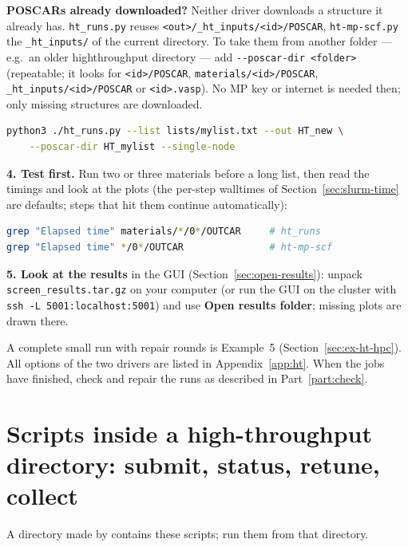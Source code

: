 \documentclass[11pt,a4paper]{scrartcl}
\newcommand{\cmd}[1]{\texttt{\detokenize{#1}}}
\begin{document}
\textbf{POSCARs already downloaded?}  Neither driver downloads a structure
it already has.  \texttt{ht\_runs.py} reuses
\texttt{<out>/\_ht\_inputs/<id>/POSCAR}, \texttt{ht-mp-scf.py} the
\texttt{\_ht\_inputs/} of the current directory.  To take them from another
folder --- e.g.\ an older highthroughput directory --- add
\texttt{-{}-poscar-dir <folder>} (repeatable; it looks for
\texttt{<id>/POSCAR}, \texttt{materials/<id>/POSCAR},
\texttt{\_ht\_inputs/<id>/POSCAR} or \texttt{<id>.vasp}).  No MP key or
internet is needed then; only missing structures are downloaded.
\begin{lstlisting}[language=bash]
python3 ./ht_runs.py --list lists/mylist.txt --out HT_new \
    --poscar-dir HT_mylist --single-node
\end{lstlisting}

\textbf{4. Test first.}  Run two or three materials before a long list, then
read the timings and look at the plots (the per-step walltimes of
Section~\ref{sec:slurm-time} are defaults; steps that hit them continue
automatically):
\begin{lstlisting}[language=bash]
grep "Elapsed time" materials/*/0*/OUTCAR     # ht_runs
grep "Elapsed time" */0*/OUTCAR               # ht-mp-scf
\end{lstlisting}

\textbf{5. Look at the results} in the GUI (Section~\ref{sec:open-results}):
unpack \texttt{screen\_results.tar.gz} on your computer (or run the GUI on
the cluster with \texttt{ssh -L 5001:localhost:5001}) and use
\textbf{Open results folder}; missing plots are drawn there.

A complete small run with repair rounds is Example~5 (Section~\ref{sec:ex-ht-hpc}).  All options of the two drivers are listed in Appendix~\ref{app:ht}.  When the jobs have finished, check and repair the runs as described in Part~\ref{part:check}.

\section{Scripts inside a high-throughput directory: submit, status, retune, collect}
\label{sec:ht-scripts}

A directory made by \cmd{ht_runs.py} contains these scripts; run them from that directory.
\end{document}

